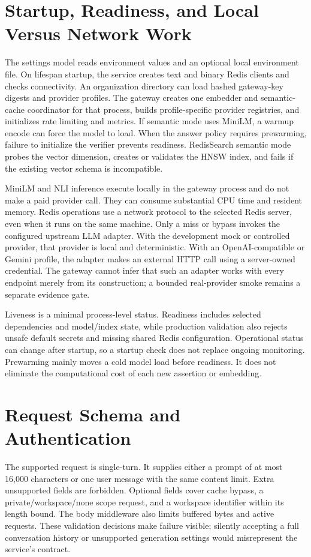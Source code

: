 \section{Startup, Readiness, and Local Versus Network Work}
The settings model reads environment values and an optional local environment file. On lifespan startup, the service creates text and binary Redis clients and checks connectivity. An organization directory can load hashed gateway-key digests and provider profiles. The gateway creates one embedder and semantic-cache coordinator for that process, builds profile-specific provider registries, and initializes rate limiting and metrics. If semantic mode uses MiniLM, a warmup encode can force the model to load. When the answer policy requires prewarming, failure to initialize the verifier prevents readiness. RedisSearch semantic mode probes the vector dimension, creates or validates the HNSW index, and fails if the existing vector schema is incompatible.

MiniLM and NLI inference execute locally in the gateway process and do not make a paid provider call. They can consume substantial CPU time and resident memory. Redis operations use a network protocol to the selected Redis server, even when it runs on the same machine. Only a miss or bypass invokes the configured upstream LLM adapter. With the development mock or controlled provider, that provider is local and deterministic. With an OpenAI-compatible or Gemini profile, the adapter makes an external HTTP call using a server-owned credential. The gateway cannot infer that such an adapter works with every endpoint merely from its construction; a bounded real-provider smoke remains a separate evidence gate.

Liveness is a minimal process-level status. Readiness includes selected dependencies and model/index state, while production validation also rejects unsafe default secrets and missing shared Redis configuration. Operational status can change after startup, so a startup check does not replace ongoing monitoring. Prewarming mainly moves a cold model load before readiness. It does not eliminate the computational cost of each new assertion or embedding.

\section{Request Schema and Authentication}
The supported request is single-turn. It supplies either a prompt of at most 16,000 characters or one user message with the same content limit. Extra unsupported fields are forbidden. Optional fields cover cache bypass, a private/workspace/none scope request, and a workspace identifier within its length bound. The body middleware also limits buffered bytes and active requests. These validation decisions make failure visible; silently accepting a full conversation history or unsupported generation settings would misrepresent the service's contract.

